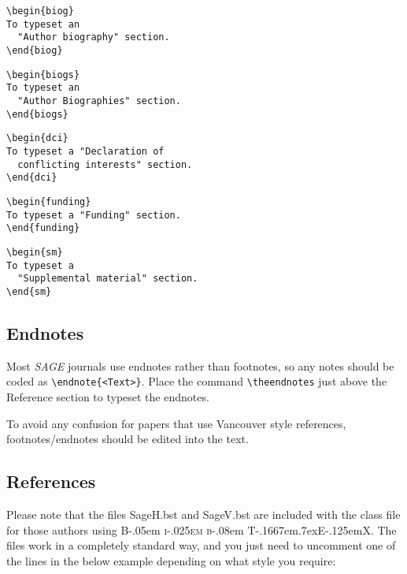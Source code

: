 \documentclass[Afour,sageh,times]{sagej}
\newcommand\BibTeX{{\rmfamily B\kern-.05em \textsc{i\kern-.025em b}\kern-.08em
T\kern-.1667em\lower.7ex\hbox{E}\kern-.125emX}}
\begin{document}
\begin{verbatim}
\begin{biog}
To typeset an
  "Author biography" section.
\end{biog}
\end{verbatim}

\begin{verbatim}
\begin{biogs}
To typeset an
  "Author Biographies" section.
\end{biogs}
\end{verbatim}


\begin{verbatim}
\begin{dci}
To typeset a "Declaration of
  conflicting interests" section.
\end{dci}
\end{verbatim}

\begin{verbatim}
\begin{funding}
To typeset a "Funding" section.
\end{funding}
\end{verbatim}

\begin{verbatim}
\begin{sm}
To typeset a
  "Supplemental material" section.
\end{sm}
\end{verbatim}

\subsection{Endnotes}
Most \textit{SAGE} journals use endnotes rather than footnotes, so any notes should be coded as \verb+\endnote{<Text>}+.
Place the command \verb+\theendnotes+ just above the Reference section to typeset the endnotes.

To avoid any confusion for papers that use Vancouver style references,  footnotes/endnotes should be edited into the text.

\subsection{References}
Please note that the files \textsf{SageH.bst} and \textsf{SageV.bst} are included with the class file
for those authors using \BibTeX.
The files work in a completely standard way, and you just need to uncomment one of the lines in the below example depending on what style you require:
\end{document}
